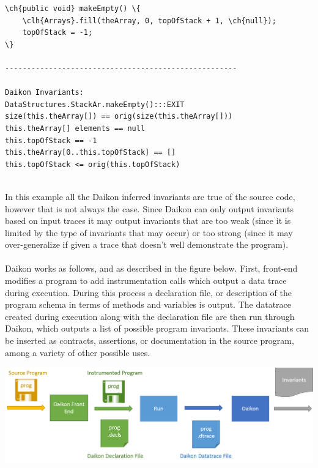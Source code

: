 \documentclass{article}
\newcommand\ch[1]{\textcolor[rgb]{0,0,1}{\textbf{#1}}}
\newcommand\clh[1]{\textcolor[rgb]{0,.5,1}{\textbf{#1}}}
\begin{document}
\begin{center}
\begin{Verbatim}[commandchars=\\\{\}]
\ch{public void} makeEmpty() \{
    \clh{Arrays}.fill(theArray, 0, topOfStack + 1, \ch{null});
    topOfStack = -1;
\}

-----------------------------------------------------

Daikon Invariants:
DataStructures.StackAr.makeEmpty():::EXIT
size(this.theArray[]) == orig(size(this.theArray[]))
this.theArray[] elements == null
this.topOfStack == -1
this.theArray[0..this.topOfStack] == []
this.topOfStack <= orig(this.topOfStack)

\end{Verbatim}
\end{center} 
\  \\
In this example all the Daikon inferred invariants are true of the source code, however that is not always the case. Since Daikon can only output invariants based on input traces it may output invariants that are too weak (since it is limited by the type of invariants that may occur) or too strong (since it may over-generalize if given a trace that doesn't well demonstrate the program).
\\ \\
Daikon works as follows, and as described in the figure below. First, front-end modifies a program to add instrumentation calls which output a data trace during execution. During this process a declaration file, or description of the program schema in terms of methods and variables is output. The datatrace created during execution along with the declaration file are then run through Daikon, which outputs a list of possible program invariants. These invariants can be inserted as contracts, assertions, or documentation in the source program, among a variety of other possible uses.

\begin{center}
\includegraphics[scale=.5]{daikon}
\end{center} 
\end{document}

